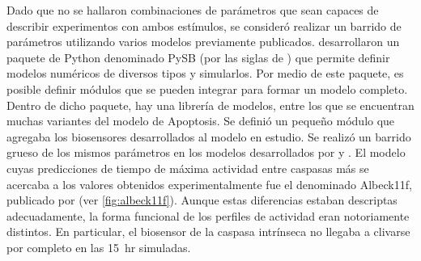 Dado que no se hallaron combinaciones de parámetros que sean capaces de describir experimentos con ambos estímulos, se consideró realizar un barrido de parámetros utilizando varios modelos previamente publicados. \cite{Lopez2013} desarrollaron un paquete de Python denominado PySB (por las siglas de ) que permite definir modelos numéricos de diversos tipos y simularlos. Por medio de este paquete, es posible definir módulos que se pueden integrar para formar un modelo completo.  Dentro de dicho paquete, hay una librería de modelos, entre los que se encuentran muchas variantes del modelo de Apoptosis. Se definió un pequeño módulo que agregaba los biosensores desarrollados al modelo en estudio. Se realizó un barrido grueso de los mismos parámetros en los modelos desarrollados por \cite{Howells2011, Albeck2008, Cui2008, Chen2007} y \cite{Chen2007a}. El modelo cuyas predicciones de tiempo de máxima actividad entre caspasas más se acercaba a los valores obtenidos experimentalmente fue el denominado Albeck11f, publicado por \cite{Albeck2008} (ver \cref{fig:albeck11f}). Aunque estas diferencias estaban descriptas adecuadamente, la forma funcional de los perfiles de actividad eran notoriamente distintos. En particular, el biosensor de la caspasa intrínseca no llegaba a clivarse por completo en las 15~hr simuladas.

